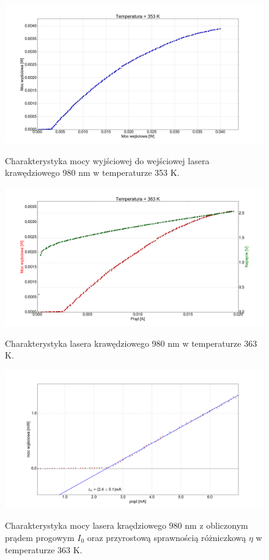 \documentclass[a4paper, portrait,12pt]{report}
\begin{document}
\begin{figure}
\center
  \includegraphics[scale=0.30]{plot980/temp_80_power.png}
  \label{rys1}
  \caption{Charakterystyka mocy wyjściowej do wejściowej lasera krawędziowego 980 nm w temperaturze 353 K.} 
\end{figure}


\begin{figure}
\center
  \includegraphics[scale=0.30]{plot980/temp_90_IVL.png}
  \label{rys1}
  \caption{Charakterystyka lasera krawędziowego 980 nm w temperaturze 363 K.} 
\end{figure}

\begin{figure}
\center
  \includegraphics[scale=0.30]{plot980/temp_90_fit.png}
  \label{rys1}
  \caption{Charakterystyka mocy lasera kraędziowego 980 nm z obliczonym prądem progowym $I_0$ oraz przyrostową sprawnością różniczkową $\eta$ w temperaturze 363 K.} 
\end{figure}
\end{document}
